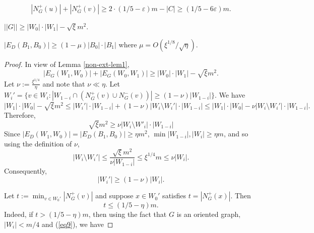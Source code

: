 \documentclass[10pt,a4paper]{amsart}
\renewcommand{\epsilon}{{\varepsilon}}
\begin{document}
\begin{equation}\label{eq3}
    |N^+_G(u)|+|N^+_G(v)|\geq 2\cdot(1/5-\epsilon)m - |C|\geq
    (1/5- 6\epsilon)m.
\end{equation}

\begin{lemma}\label{non-ext-lem1}
 $||G||\geq |W_0|\cdot |W_1|-\sqrt{\xi}m^2.$
\end{lemma}

\begin{lemma}\label{non-ext-lem2}
$|E_D(B_1, B_0)|\geq (1-\mu)|B_0|\cdot |B_1|$ where $\mu=O(\xi^{1/8}/\sqrt{\eta})$. 
\end{lemma}

\begin{proof}
In view of Lemma \ref{non-ext-lem1},
$$|E_G(W_1, W_0)|+|E_G(W_0,W_1)|\geq |W_0|\cdot |W_1|- \sqrt{\xi} m^2.$$
Let $\nu:=\frac{\xi^{1/4}}{\eta}$ and note that $\nu \ll \eta$. Let $W_i'= \{v\in W_i: |W_{1-i} \cap (N^+_G(v)\cup N^-_G(v))| \geq (1-\nu)|W_{1-i}|\}.$
We have
$$|W_1|\cdot |W_0| -\sqrt{\xi} m^2\leq |W_i'|\cdot |W_{1-i}|+ (1-\nu)|W_i\setminus W_i'|\cdot |W_{1-i}|\leq |W_1|\cdot |W_0|-\nu |W_i\setminus W_i'|\cdot |W_{1-i}|.$$
Therefore, \[
    \sqrt{\xi}m^2 \geq \nu|W_i \setminus W'_i|\cdot |W_{1 - i}|
\]
Since $|E_D(W_1,W_0)|=|E_D(B_1, B_0)|\geq \eta m^2$, $\min{|W_{1-i}|, |W_i|}\geq \eta m$, and so using the definition of $\nu$,
\begin{equation}\label{eq9}
|W_i\setminus W_i'|\leq \frac{\sqrt{\xi}m^2}{\nu |W_{1-i}|}\leq \xi^{1/4}m\leq \nu |W_i|.\end{equation}
Consequently,
$$|W_i'|\geq (1-\nu)|W_i|.$$

Let $t:= \min_{v\in W_0'}|N^+_{G}(v)|$ and suppose $x\in W_0'$  satisfies $t= |N^+_{G}(x)|.$ 
Then 
\begin{equation}\label{eq-ne-t}
    t\leq (1/5-\eta)m.
\end{equation}
Indeed, if $t>(1/5-\eta)m$, then using the fact that $G$ is an oriented graph, $|W_i|< m/4$ and (\ref{eq9}), we have


\end{proof}
\end{document}
